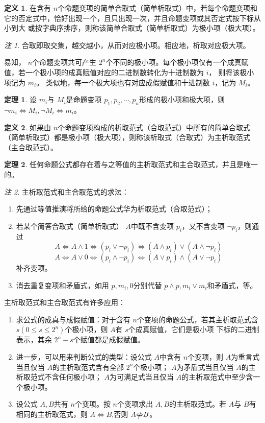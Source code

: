 \documentclass[a4paper,11pt]{article}%
\theoremstyle{remark}
\newtheorem*{remark}{注}
\theoremstyle{remark}
\theoremstyle{definition}
\newtheorem{theorem}{定理}[section]
\theoremstyle{definition}
\newtheorem*{definition}{定义}
\theoremstyle{plain}
\begin{document}
\begin{definition}
    在含有 $n$个命题变项的简单合取式（简单析取式）中，若每个命题变项和它的否定式中，恰好出现一个，且只出现一次，并且命题变项或其否定式按下标从小到大
    或按字典序排序，则称该简单合取式（简单析取式）为极小项（极大项）。
\end{definition}
\begin{remark}
    合取即取交集，越交越小，从而对应极小项。相应地，析取对应极大项。

    易知， $n$个命题变项共可产生 $2^n$个不同的极小项。每个极小项仅有一个成真赋值，若一个极小项的成真赋值对应的二进制数转化为十进制数为 $i$，
    则将该极小项记为 $m_i$。
    类似地，每一个极大项也有对应成假赋值和十进制数 $i$，记为 $M_i$。
\end{remark}
\begin{theorem}
    设 $m_i$与 $M_i$是命题变项 $p_1,p_2,\cdots,p_n$形成的极小项和极大项，则 $\lnot m_i\Leftrightarrow M_i,\lnot M_i\Leftrightarrow m_i$。
\end{theorem}
\begin{definition}
    如果由 $n$个命题变项构成的析取范式（合取范式）中所有的简单合取式（简单析取式）都是极小项（极大项），则称该析取式（合取式）为主析取范式（主合取范式）。
\end{definition}
\begin{theorem}
    任何命题公式都存在着与之等值的主析取范式和主合取范式，并且是唯一的。
\end{theorem}
\begin{remark}
    主析取范式和主合取范式的求法：
    \begin{enumerate}
        \item 先通过等值推演将所给的命题公式华为析取范式（合取范式）；
        \item 若某个简答合取式（简单析取式） $A$中既不含变项 $p_i$，又不含变项 $\lnot p_i$，则通过
        \[A\Leftrightarrow A\land 1\Leftrightarrow (p_i\lor \lnot p_i)\Leftrightarrow(A\land p_i)\lor(A\land\lnot p_i)\]
        \[A\Leftrightarrow A\lor 0\Leftrightarrow(p_i\land\lnot p_i)\Leftrightarrow(A\lor p_i)\land(A\lor \lnot p_i)\]
        补齐变项。
        \item 消去重复变项和矛盾式，如用 $p,m_i,0$分别代替 $p\land p,m_i\lor m_i$和矛盾式，等。
    \end{enumerate}
\end{remark}
主析取范式和主合取范式有许多应用：
\begin{enumerate}
    \item 求公式的成真与成假赋值：对于含有 $n$个变项的命题公式，若其主析取范式含 $s(0\leq s\leq 2^n)$个极小项，则 $A$有 $s$个成真赋值，它们是极小项
    下标的二进制表示，其余 $2^n-s$个赋值都是成假赋值。
    \item 进一步，可以用来判断公式的类型：设公式 $A$中含有 $n$个变项，则 $A$为重言式当且仅当 $A$的主析取范式含有全部 $2^n$个极小项； $A$为矛盾式当且仅当
    $A$的主析取范式不含任何极小项； $A$为可满足式当且仅当 $A$的主析取范式中至少含一个极小项。
    \item 设公式 $A,B$共有 $n$个变项。按 $n$个变项求出 $A,B$的主析取范式。若 $A$与 $B$有相同的主析取范式，则 $A\Leftrightarrow B$,否则 $A\slashed{\Leftrightarrow}B$。
\end{enumerate}
\end{document}
